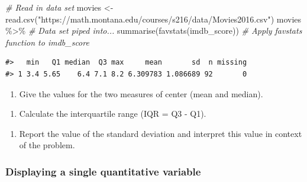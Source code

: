 \documentclass[
]{report}
\newenvironment{Shaded}{\begin{snugshade}}{\end{snugshade}}
\newcommand{\CommentTok}[1]{\textcolor[rgb]{0.56,0.35,0.01}{\textit{#1}}}
\newcommand{\FunctionTok}[1]{\textcolor[rgb]{0.00,0.00,0.00}{#1}}
\newcommand{\NormalTok}[1]{#1}
\newcommand{\OtherTok}[1]{\textcolor[rgb]{0.56,0.35,0.01}{#1}}
\newcommand{\SpecialCharTok}[1]{\textcolor[rgb]{0.00,0.00,0.00}{#1}}
\newcommand{\StringTok}[1]{\textcolor[rgb]{0.31,0.60,0.02}{#1}}
\providecommand{\tightlist}{%
  \setlength{\itemsep}{0pt}\setlength{\parskip}{0pt}}
\begin{document}
\begin{Shaded}
\begin{Highlighting}[]
\CommentTok{\# Read in data set}
\NormalTok{movies }\OtherTok{\textless{}{-}} \FunctionTok{read.csv}\NormalTok{(}\StringTok{"https://math.montana.edu/courses/s216/data/Movies2016.csv"}\NormalTok{) }
\NormalTok{movies }\SpecialCharTok{\%\textgreater{}\%} \CommentTok{\# Data set piped into...}
  \FunctionTok{summarise}\NormalTok{(}\FunctionTok{favstats}\NormalTok{(imdb\_score)) }\CommentTok{\# Apply favstats function to imdb\_score}
\end{Highlighting}
\end{Shaded}

\begin{verbatim}
#>   min   Q1 median  Q3 max     mean       sd  n missing
#> 1 3.4 5.65    6.4 7.1 8.2 6.309783 1.086689 92       0
\end{verbatim}

\begin{enumerate}
\def\labelenumi{\arabic{enumi}.}
\tightlist
\item
  Give the values for the two measures of center (mean and median).
\end{enumerate}

\vspace{0.5in}

\begin{enumerate}
\def\labelenumi{\arabic{enumi}.}
\setcounter{enumi}{1}
\tightlist
\item
  Calculate the interquartile range (IQR = Q3 - Q1).
\end{enumerate}

\vspace{0.5in}

\begin{enumerate}
\def\labelenumi{\arabic{enumi}.}
\setcounter{enumi}{2}
\tightlist
\item
  Report the value of the standard deviation and interpret this value in context of the problem.
  \vspace{0.8in}
\end{enumerate}

\hypertarget{displaying-a-single-quantitative-variable}{%
\subsubsection*{Displaying a single quantitative variable}\label{displaying-a-single-quantitative-variable}}
\end{document}
